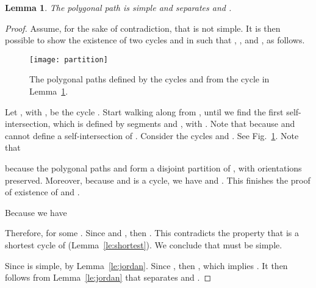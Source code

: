 \documentclass[11pt,a4paper]{article}
\newtheorem{lemma}[definition]{Lemma}
\begin{document}
\begin{lemma}\label{le:feasible}
	The polygonal path  is simple and separates  and .
\end{lemma}
\begin{proof}
Assume, for the sake of contradiction, that  is not simple.
	It is then possible to show the existence of two cycles  and  in  such that
	,
	,
	and ,
	as follows.
	
	\begin{figure}
		\centering
			\texttt{[image: partition]}
			\caption{The polygonal paths defined by the cycles  and  from the cycle  in Lemma~\ref{le:feasible}.}
			\label{fig:partition}
	\end{figure}	

	Let , with , be the cycle .
	Start walking along  from , until we find the first self-intersection,
	which is defined by segments  and , with .
	Note that  because  and  cannot define a self-intersection of .
	Consider the cycles 
	and . See Fig.~\ref{fig:partition}.
	Note that
	
	because the polygonal paths  and  form a disjoint partition
	of , with orientations preserved.
	Moreover, because  and  is a cycle,
	we have  and .
	This finishes the proof of existence of  and .

	Because  we have 
	
	Therefore,  for some . 
	Since  and ,
	then . This contradicts the property that  is a shortest
	cycle of  (Lemma~\ref{le:shortest}).
	We conclude that  must be simple.
		
	Since  is simple,  by Lemma~\ref{le:jordan}.
	Since , then , which implies .
	It then follows from Lemma~\ref{le:jordan} that  separates  and .\qedhere	
\end{proof}
\end{document}
